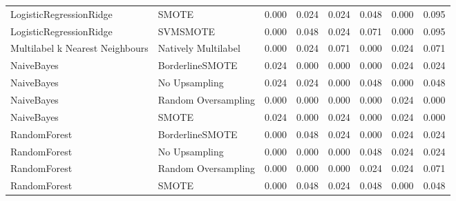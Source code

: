 \begin{tabular}{llllllll}
        LogisticRegressionRidge &                         SMOTE & 0.000 &                     0.024 &                 0.024 &                  0.048 &                                   0.000 &     0.095 \\
        LogisticRegressionRidge &                      SVMSMOTE & 0.000 &                     0.048 &                 0.024 &                  0.071 &                                   0.000 &     0.095 \\
Multilabel k Nearest Neighbours &           Natively Multilabel & 0.000 &                     0.024 &                 0.071 &                  0.000 &                                   0.024 &     0.071 \\
                     NaiveBayes &               BorderlineSMOTE & 0.024 &                     0.000 &                 0.000 &                  0.000 &                                   0.024 &     0.024 \\
                     NaiveBayes &                 No Upsampling & 0.024 &                     0.024 &                 0.000 &                  0.048 &                                   0.000 &     0.048 \\
                     NaiveBayes &           Random Oversampling & 0.000 &                     0.000 &                 0.000 &                  0.000 &                                   0.024 &     0.000 \\
                     NaiveBayes &                         SMOTE & 0.024 &                     0.000 &                 0.024 &                  0.000 &                                   0.024 &     0.000 \\
                   RandomForest &               BorderlineSMOTE & 0.000 &                     0.048 &                 0.024 &                  0.000 &                                   0.024 &     0.024 \\
                   RandomForest &                 No Upsampling & 0.000 &                     0.000 &                 0.000 &                  0.048 &                                   0.024 &     0.024 \\
                   RandomForest &           Random Oversampling & 0.000 &                     0.000 &                 0.000 &                  0.024 &                                   0.024 &     0.071 \\
                   RandomForest &                         SMOTE & 0.000 &                     0.048 &                 0.024 &                  0.048 &                                   0.000 &     0.048 \\

\end{tabular}
